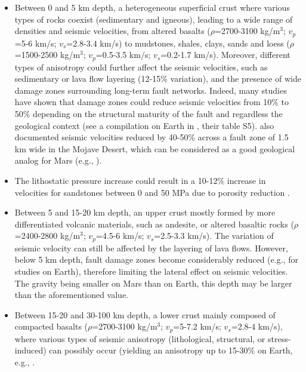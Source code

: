 \begin{itemize}
	\item Between 0 and 5 km depth, a heterogeneous superficial crust where various types of rocks coexist (sedimentary and igneous), leading to a wide range of densities and seismic velocities, from altered basalts ($\rho$=2700-3100 kg/m$^3$; $v_p$=5-6 km/s; $v_s$=2.8-3.4 km/s) to mudstones, shales, clays, sands and loess ($\rho$=1500-2500 kg/m$^3$; $v_p$=0.5-3.5 km/s; $v_s$=0.2-1.7 km/s). Moreover, different types of anisotropy could further affect the seismic velocities, such as sedimentary or lava flow layering (12-15\% variation), and the presence of wide damage zones surrounding long-term fault networks. Indeed, many studies have shown that damage zones could reduce seismic velocities from 10\% to 50\% depending on the structural maturity of the fault and regardless the geological context (see a compilation on Earth in \citet{Perrin2016}, their table S5). \citet{Cochran2009} also documented seismic velocities reduced by 40-50\% across a fault zone of 1.5 km wide in the Mojave Desert, which can be considered as a good geological analog for Mars (e.g., \citep{Golombek1997,Marlow2008}).
    \item The lithostatic pressure increase could result in a 10-12\% increase in velocities for sandstones between 0 and 50 MPa due to porosity reduction \citep{Han1986}.
    \item Between 5 and 15-20 km depth, an upper crust mostly formed by more differentiated volcanic materials, such as andesite, or altered basaltic rocks ($\rho$=2400-2800 kg/m$^3$; $v_p$=4.5-6 km/s; $v_s$=2.5-3.3 km/s). The variation of seismic velocity can still be affected by the layering of lava flows. However, below 5 km depth, fault damage zones become considerably reduced (e.g., \citep{Ben-Zion2003,Finzi2009,Allam2014} for studies on Earth), therefore limiting the lateral effect on seismic velocities. The gravity being smaller on Mars than on Earth, this depth may be larger than the aforementioned value.
    \item Between 15-20 and 30-100 km depth, a lower crust mainly composed of compacted basalts ($\rho$=2700-3100 kg/m$^3$; $v_p$=5-7.2 km/s; $v_s$=2.8-4 km/s), where various types of seismic anisotropy (lithological, structural, or stress-induced) can possibly occur (yielding an anisotropy up to 15-30\% on Earth, e.g., \citep{Crampin1991,Weiss1999}.
\end{itemize}


